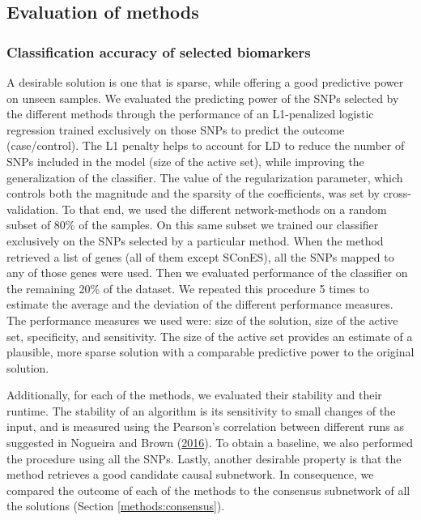 \documentclass[
  11pt,
]{env/yjiao}
\begin{document}
\hypertarget{sec:orgc968928}{%
\subsection{Evaluation of methods}\label{sec:orgc968928}}

\hypertarget{methods:comparison}{%
\subsubsection{Classification accuracy of selected biomarkers}\label{methods:comparison}}

A desirable solution is one that is sparse, while offering a good
predictive power on unseen samples. We evaluated the predicting power of
the SNPs selected by the different methods through the performance of an
L1-penalized logistic regression trained exclusively on those SNPs to
predict the outcome (case/control). The L1 penalty helps to account for
LD to reduce the number of SNPs included in the model (size of the
active set), while improving the generalization of the classifier. The
value of the regularization parameter, which controls both the magnitude
and the sparsity of the coefficients, was set by cross-validation. To
that end, we used the different network-methods on a random subset of
80\% of the samples. On this same subset we trained our classifier
exclusively on the SNPs selected by a particular method. When the method
retrieved a list of genes (all of them except SConES), all the SNPs
mapped to any of those genes were used. Then we
evaluated performance of the classifier on the remaining 20\% of the
dataset. We repeated this procedure 5 times to estimate the average and
the deviation of the different performance measures. The
performance measures we used were: size of the solution, size of the
active set, specificity, and sensitivity. The size of the active set
provides an estimate of a plausible, more sparse solution with a
comparable predictive power to the original solution.

Additionally, for each of the methods, we evaluated their stability and
their runtime. The stability of an algorithm is its sensitivity to small
changes of the input, and is measured using the Pearson's correlation
between different runs as suggested in Nogueira and Brown (\protect\hyperlink{ref-nogueira_measuring_2016}{2016}). To
obtain a baseline, we also performed the procedure using all the SNPs.
Lastly, another desirable property is that the method retrieves a good
candidate causal subnetwork. In consequence, we compared the outcome of
each of the methods to the consensus subnetwork of all the solutions
(Section \ref{methods:consensus}).
\end{document}
